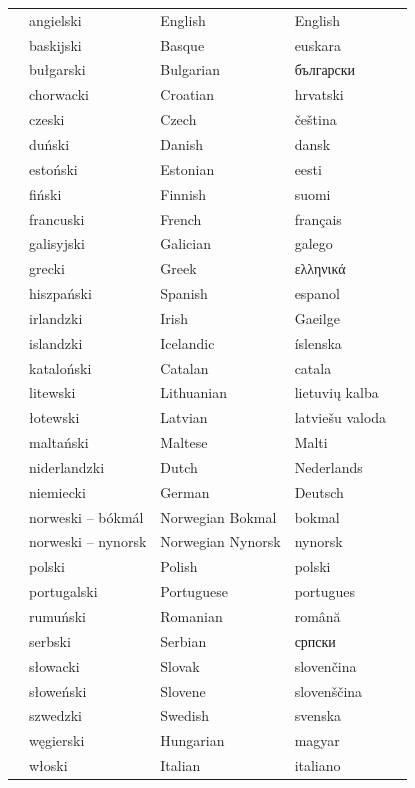 \vspace*{-5mm}
\centering
  \setlength{\tabcolsep}{2em}
  \begin{tabularx}{\textwidth}{lllll} \toprule\addlinespace
&angielski& English& English& \\
&baskijski& Basque& euskara& \\
&bułgarski& Bulgarian& български& \\
&chorwacki& Croatian& hrvatski& \\
&czeski& Czech& čeština& \\
&duński& Danish& dansk& \\
&estoński& Estonian& eesti& \\
&fiński& Finnish& suomi& \\
&francuski& French& français& \\
&galisyjski& Galician& galego& \\
&grecki& Greek & ελληνικά \\
&hiszpański& Spanish & espanol& \\
&irlandzki& Irish& Gaeilge& \\
&islandzki& Icelandic& íslenska& \\
&kataloński& Catalan& catala& \\
&litewski& Lithuanian& lietuvi\k{u} kalba& \\
&łotewski& Latvian& latviešu valoda& \\
&maltański& Maltese& Malti& \\
&niderlandzki& Dutch& Nederlands& \\
&niemiecki& German& Deutsch& \\
&norweski – bókmál& Norwegian Bokmal& bokmal& \\
&norweski – nynorsk& Norwegian Nynorsk& nynorsk& \\
&polski& Polish& polski& \\
&portugalski& Portuguese& portugues& \\
&rumuński& Romanian& română& \\
&serbski& Serbian& српски& \\
&słowacki& Slovak& slovenčina& \\
&słoweński& Slovene& slovenščina& \\
&szwedzki& Swedish& svenska& \\
&węgierski& Hungarian& magyar& \\
&włoski& Italian& italiano& \\
\bottomrule
\end{tabularx}
